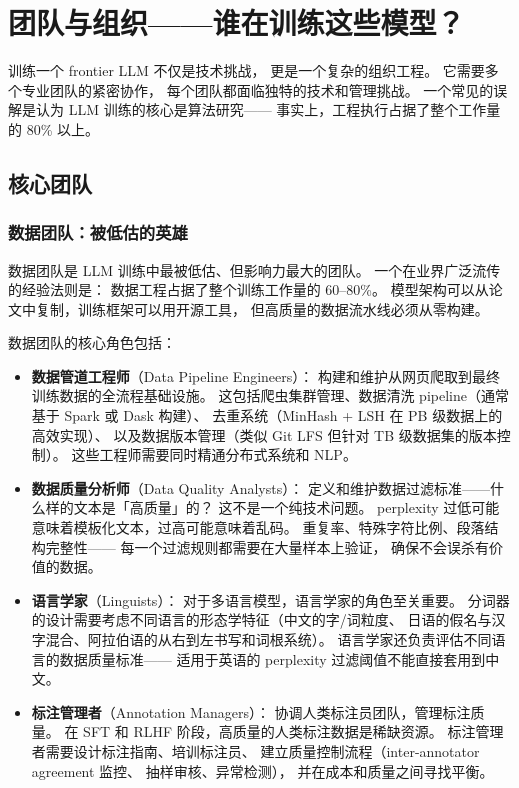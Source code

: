\chapter{团队与组织——谁在训练这些模型？}
\label{ch:org}

训练一个 frontier LLM 不仅是技术挑战，
更是一个复杂的组织工程。
它需要多个专业团队的紧密协作，
每个团队都面临独特的技术和管理挑战。
一个常见的误解是认为 LLM 训练的核心是算法研究——
事实上，工程执行占据了整个工作量的 80\% 以上。

\section{核心团队}

\subsection{数据团队：被低估的英雄}

数据团队是 LLM 训练中最被低估、但影响力最大的团队。
一个在业界广泛流传的经验法则是：
数据工程占据了整个训练工作量的 60--80\%。
模型架构可以从论文中复制，训练框架可以用开源工具，
但高质量的数据流水线必须从零构建。

数据团队的核心角色包括：

\begin{itemize}[noitemsep]
  \item \textbf{数据管道工程师}（Data Pipeline Engineers）：
        构建和维护从网页爬取到最终训练数据的全流程基础设施。
        这包括爬虫集群管理、数据清洗 pipeline（通常基于 Spark 或 Dask 构建）、
        去重系统（MinHash + LSH 在 PB 级数据上的高效实现）、
        以及数据版本管理（类似 Git LFS 但针对 TB 级数据集的版本控制）。
        这些工程师需要同时精通分布式系统和 NLP。
  \item \textbf{数据质量分析师}（Data Quality Analysts）：
        定义和维护数据过滤标准——什么样的文本是「高质量」的？
        这不是一个纯技术问题。
        perplexity 过低可能意味着模板化文本，过高可能意味着乱码。
        重复率、特殊字符比例、段落结构完整性——
        每一个过滤规则都需要在大量样本上验证，
        确保不会误杀有价值的数据。
  \item \textbf{语言学家}（Linguists）：
        对于多语言模型，语言学家的角色至关重要。
        分词器的设计需要考虑不同语言的形态学特征（中文的字/词粒度、
        日语的假名与汉字混合、阿拉伯语的从右到左书写和词根系统）。
        语言学家还负责评估不同语言的数据质量标准——
        适用于英语的 perplexity 过滤阈值不能直接套用到中文。
  \item \textbf{标注管理者}（Annotation Managers）：
        协调人类标注员团队，管理标注质量。
        在 SFT 和 RLHF 阶段，高质量的人类标注数据是稀缺资源。
        标注管理者需要设计标注指南、培训标注员、
        建立质量控制流程（inter-annotator agreement 监控、
        抽样审核、异常检测），
        并在成本和质量之间寻找平衡。
\end{itemize}

